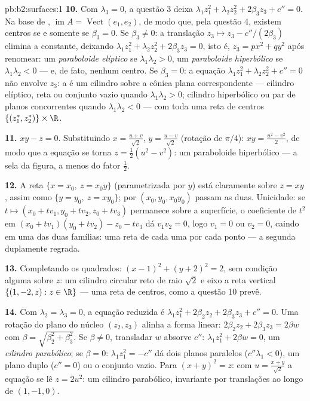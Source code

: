 \begin{solution}{pb:b2:surfaces:1}
\textbf{10.} Com $\lambda_3 = 0$, a questão 3 deixa
$\lambda_1z_1^2 + \lambda_2z_2^2 + 2\beta_3z_3 + c'' = 0$. Na
base de , $\operatorname{im}A = \operatorname{Vect}(e_1,
e_2)$, de modo que, pela questão 4, existem centros se e somente se $\beta_3 = 0$. Se
$\beta_3 \neq 0$: a translação $z_3 \mapsto z_3 -
c''/(2\beta_3)$ elimina a constante, deixando $\lambda_1z_1^2
+ \lambda_2z_2^2 + 2\beta_3z_3 = 0$, isto é, $z_3 = px^2 +
qy^2$ após renomear: um \emph{paraboloide elíptico} se
$\lambda_1\lambda_2 > 0$, um \emph{paraboloide hiperbólico} se
$\lambda_1\lambda_2 < 0$ --- e, de fato, nenhum centro. Se
$\beta_3 = 0$: a equação $\lambda_1z_1^2 + \lambda_2z_2^2 +
c'' = 0$ não envolve $z_3$: a  é um cilindro
sobre a cônica plana correspondente --- cilindro elíptico,
reta ou conjunto vazio quando $\lambda_1\lambda_2 > 0$; cilindro
hiperbólico ou par de planos concorrentes quando
$\lambda_1\lambda_2 < 0$ --- com toda uma reta de centros
$\{(z_1^*, z_2^*)\} \times \R$.

\textbf{11.} $xy - z = 0$. Substituindo $x = \frac{u +
v}{\sqrt2}$, $y = \frac{u - v}{\sqrt2}$ (rotação de $\pi/4$):
$xy = \frac{u^2 - v^2}2$, de modo que a equação se torna $z =
\frac12(u^2 - v^2)$: um paraboloide hiperbólico --- a sela
da figura, a menos do fator $\frac12$.

\textbf{12.} A reta $\{x = x_0,\ z = x_0y\}$ (parametrizada
por $y$) está claramente sobre $z = xy$, assim como $\{y = y_0,\ z =
xy_0\}$; por $(x_0, y_0, x_0y_0)$ passam as duas.
Unicidade: se $t \mapsto (x_0 + tv_1, y_0 + tv_2, z_0 +
tv_3)$ permanece sobre a superfície, o coeficiente de $t^2$ em $(x_0
+ tv_1)(y_0 + tv_2) - z_0 - tv_3$ dá $v_1v_2 = 0$, logo
$v_1 = 0$ ou $v_2 = 0$, caindo em uma das duas famílias:
uma reta de cada uma por cada ponto --- a segunda 
duplamente regrada.

\textbf{13.} Completando os quadrados: $(x - 1)^2 + (y + 2)^2 = 2$,
sem condição alguma sobre $z$: um cilindro circular reto de raio
$\sqrt2$ e eixo a reta vertical $\{(1, -2, z) : z \in
\R\}$ --- uma reta de centros, como a questão 10 prevê.

\textbf{14.} Com $\lambda_2 = \lambda_3 = 0$, a equação reduzida
é $\lambda_1z_1^2 + 2\beta_2z_2 + 2\beta_3z_3 + c''
= 0$. Uma rotação do plano do núcleo $(z_2, z_3)$ alinha
a forma linear: $2\beta_2z_2 + 2\beta_3z_3 = 2\beta w$ com
$\beta = \sqrt{\beta_2^2 + \beta_3^2}$. Se $\beta \neq 0$,
transladar $w$ absorve $c''$: $\lambda_1z_1^2 + 2\beta w =
0$, um \emph{cilindro parabólico}; se $\beta = 0$:
$\lambda_1z_1^2 = -c''$ dá dois planos paralelos ($c''
\lambda_1 < 0$), um plano duplo ($c'' = 0$) ou o conjunto
vazio. Para $(x + y)^2 = z$: com $u = \frac{x + y}{\sqrt2}$ a
equação se lê $z = 2u^2$: um cilindro parabólico, invariante
por translações ao longo de $(1, -1, 0)$.


\end{solution}
